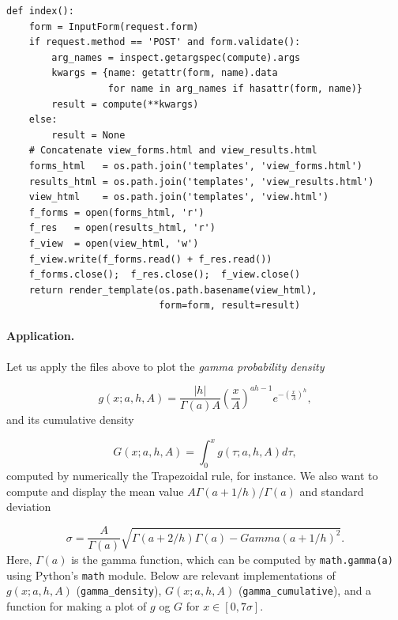 \documentclass[%
oneside,                 %
final,                   %
10pt]{article}
\begin{document}
\begin{Verbatim}[numbers=none,fontsize=\fontsize{9pt}{9pt},baselinestretch=0.85]
def index():
    form = InputForm(request.form)
    if request.method == 'POST' and form.validate():
        arg_names = inspect.getargspec(compute).args
        kwargs = {name: getattr(form, name).data
                  for name in arg_names if hasattr(form, name)}
        result = compute(**kwargs)
    else:
        result = None
    # Concatenate view_forms.html and view_results.html
    forms_html   = os.path.join('templates', 'view_forms.html')
    results_html = os.path.join('templates', 'view_results.html')
    view_html    = os.path.join('templates', 'view.html')
    f_forms = open(forms_html, 'r')
    f_res   = open(results_html, 'r')
    f_view  = open(view_html, 'w')
    f_view.write(f_forms.read() + f_res.read())
    f_forms.close();  f_res.close();  f_view.close()
    return render_template(os.path.basename(view_html),
                           form=form, result=result)
\end{Verbatim}

\paragraph{Application.}
Let us apply the files above to plot the \emph{gamma probability density}

\[ g(x; a, h, A) = \frac{|h|}{\Gamma(a)A}\left(\frac{x}{A}\right)^{ah-1}
e^{-\left(\frac{x}{A}\right)^h},
\]
and its cumulative density

\[ G(x; a, h, A) = \int_0^x g(\tau; a, h, A)d\tau,\]
computed by numerically the Trapezoidal rule, for instance.
We also want to compute and display
the mean value $A\Gamma(a + 1/h)/\Gamma(a)$ and
standard deviation

\[ \sigma = \frac{A}{\Gamma(a)}\sqrt{\Gamma(a + 2/h)\Gamma(a) - Gamma(a+1/h)^2}.\]
Here, $\Gamma(a)$ is the gamma function, which can be computed
by \Verb!math.gamma(a)! using Python's \Verb!math! module.
Below are relevant implementations of $g(x;a,h,A)$ (\Verb!gamma_density!),
$G(x; a, h, A)$ (\Verb!gamma_cumulative!), and a function for
making a plot of $g$ og $G$ for $x\in [0,7\sigma]$.
\end{document}
